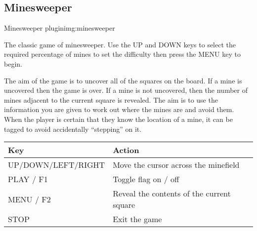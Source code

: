 \subsection{Minesweeper}
%
{Minesweeper plugin}{img:minesweeper}

The classic game of minesweeper.  Use the UP and DOWN keys to select the
required percentage of mines to set the difficulty then press the MENU
key to begin.

The aim of the game is to uncover all of the squares on the board.  If a
mine is uncovered then the game is over.  If a mine is not uncovered,
then the number of mines adjacent to the current square is revealed. 
The aim is to use the information you are given to work out where the
mines are and avoid them.  When the player is certain that they know
the location of a mine, it can be tagged to avoid accidentally
``stepping'' on it.

\begin{table}[h!]
\begin{tabular}{@{}ll@{}}\toprule
\textbf{Key} & \textbf{Action} \\\midrule
UP/DOWN/LEFT/RIGHT & Move the cursor across the minefield \\
PLAY / F1 & Toggle flag on / off \\
MENU / F2 & Reveal the contents of the current square \\
STOP & Exit the game \\\bottomrule
\end{tabular}
\end{table}
